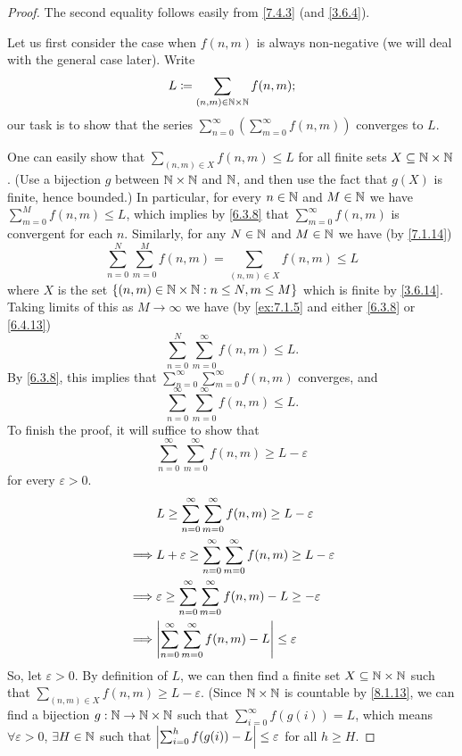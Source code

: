 \begin{proof}
	The second equality follows easily from \cref{7.4.3} (and \cref{3.6.4}).

	Let us first consider the case when \(f(n, m)\) is always non-negative (we will deal with the general case later).
	Write
	\[
		L \coloneqq \sum_{(n, m) \in \mathbb{N} \times \mathbb{N}} f(n, m);
	\]
	our task is to show that the series \(\sum_{n = 0}^\infty (\sum_{m = 0}^\infty f(n, m))\) converges to \(L\).

	One can easily show that \(\sum_{(n, m) \in X} f(n, m) \leq L\) for all finite sets \(X \subseteq \mathbb{N} \times \mathbb{N}\).
	(Use a bijection \(g\) between \(\mathbb{N} \times \mathbb{N}\) and \(\mathbb{N}\), and then use the fact that \(g(X)\) is finite, hence bounded.)
	In particular, for every \(n \in \mathbb{N}\) and \(M \in \mathbb{N}\) we have \(\sum_{m = 0}^M f(n, m) \leq L\), which implies by \cref{6.3.8} that \(\sum_{m = 0}^\infty f(n, m)\) is convergent for each \(n\).
	Similarly, for any \(N \in \mathbb{N}\) and \(M \in \mathbb{N}\) we have (by \cref{7.1.14})
	\[
		\sum_{n = 0}^N \sum_{m = 0}^M f(n, m) = \sum_{(n, m) \in X} f(n, m) \leq L
	\]
	where \(X\) is the set \(\left\lbrace(n,m) \in \mathbb{N} \times \mathbb{N} : n \leq N, m \leq M\right\rbrace\) which is finite by \cref{3.6.14}.
	Taking limits of this as \(M \to \infty\) we have (by \cref{ex:7.1.5} and either \cref{6.3.8} or \cref{6.4.13})
	\[
		\sum_{n = 0}^N \sum_{m = 0}^\infty f(n, m) \leq L.
	\]
	By \cref{6.3.8}, this implies that \(\sum_{n = 0}^\infty \sum_{m = 0}^\infty f(n, m)\) converges, and
	\[
		\sum_{n = 0}^\infty \sum_{m = 0}^\infty f(n, m) \leq L.
	\]
	To finish the proof, it will suffice to show that
	\[
		\sum_{n = 0}^\infty \sum_{m = 0}^\infty f(n, m) \geq L - \varepsilon
	\]
	for every \(\varepsilon > 0\).
	\begin{align*}
		         & L \geq \sum_{n = 0}^\infty \sum_{m = 0}^\infty f(n, m) \geq L - \varepsilon               \\
		\implies & L + \varepsilon \geq \sum_{n = 0}^\infty \sum_{m = 0}^\infty f(n, m) \geq L - \varepsilon \\
		\implies & \varepsilon \geq \sum_{n = 0}^\infty \sum_{m = 0}^\infty f(n, m) - L \geq -\varepsilon    \\
		\implies & \abs{\sum_{n = 0}^\infty \sum_{m = 0}^\infty f(n, m) - L} \leq \varepsilon                \\
	\end{align*}
	So, let \(\varepsilon > 0\).
	By definition of \(L\), we can then find a finite set \(X \subseteq \mathbb{N} \times \mathbb{N}\) such that \(\sum_{(n, m) \in X} f(n, m) \geq L - \varepsilon\).
	(Since \(\mathbb{N} \times \mathbb{N}\) is countable by \cref{8.1.13}, we can find a bijection \(g : \mathbb{N} \to \mathbb{N} \times \mathbb{N}\) such that \(\sum_{i = 0}^\infty f(g(i)) = L\), which means \(\forall \varepsilon > 0\), \(\exists H \in \mathbb{N}\) such that \(\left\lvert\sum_{i = 0}^h f(g(i)) - L\right\rvert \leq \varepsilon\) for all \(h \geq H\).

\end{proof}
